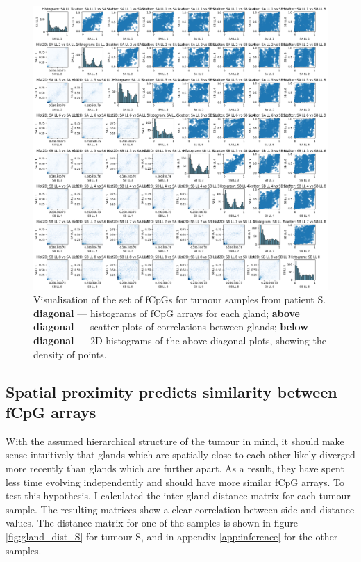 \begin{figure}[h]
    \centering
    \includegraphics[width=\textwidth]{Chapter_5/figures/fCpG_loci_S.png}
    \caption{Visualisation of the set of fCpGs for tumour samples from patient
    S. \textbf{diagonal} --- histograms of fCpG arrays for each gland;
    \textbf{above diagonal} --- scatter plots of correlations between glands;
    \textbf{below diagonal} --- $2$D histograms of the above-diagonal plots,
    showing the density of points.}
    \label{fig:fCpG_loci_S}
\end{figure}


\subsection{Spatial proximity predicts similarity between fCpG arrays}
With the assumed hierarchical structure of the tumour in mind, it should make
sense intuitively that glands which are spatially close to each other likely
diverged more recently than glands which are further apart. As a result, they
have spent less time evolving independently and should have more similar fCpG
arrays. To test this hypothesis, I calculated the inter-gland distance matrix
for each tumour sample. The resulting matrices show a clear correlation between
side and distance values. The distance matrix for one of the samples is shown
in figure \ref{fig:gland_dist_S} for tumour S, and in appendix
\ref{app:inference} for the other samples.

